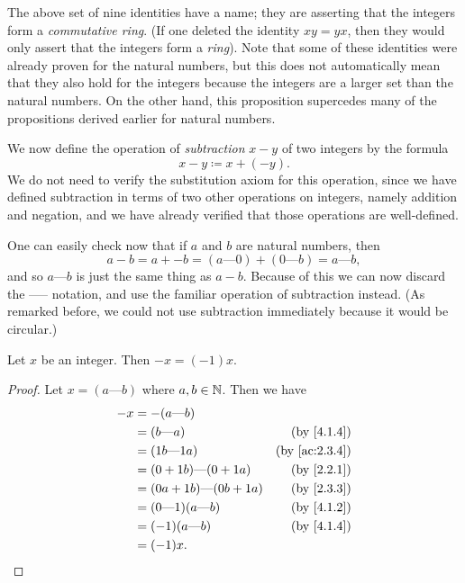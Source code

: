 \begin{rmk}\label{4.1.7}
  The above set of nine identities have a name; they are asserting that the integers form a \emph{commutative ring}.
  (If one deleted the identity \(xy = yx\), then they would only assert that the integers form a \emph{ring}).
  Note that some of these identities were already proven for the natural numbers, but this does not automatically mean that they also hold for the integers because the integers are a larger set than the natural numbers.
  On the other hand, this proposition supercedes many of the propositions derived earlier for natural numbers.
\end{rmk}

\begin{note}
  We now define the operation of \emph{subtraction} \(x - y\) of two integers by the formula
  \[
    x - y \coloneqq x + (-y).
  \]
  We do not need to verify the substitution axiom for this operation, since we have defined subtraction in terms of two other operations on integers, namely addition and negation, and we have already verified that those operations are well-defined.
\end{note}

\begin{note}
  One can easily check now that if \(a\) and \(b\) are natural numbers, then
  \[
    a - b = a + -b = (a \text{---} 0) + (0 \text{---} b) = a \text{---} b,
  \]
  and so \(a \text{---} b\) is just the same thing as \(a - b\).
  Because of this we can now discard the ----- notation, and use the familiar operation of subtraction instead.
  (As remarked before, we could not use subtraction immediately because it would be circular.)
\end{note}

\begin{ac}\label{ac:4.1.3}
  Let \(x\) be an integer.
  Then \(-x = (-1)x\).
\end{ac}

\begin{proof}
  Let \(x = (a \text{---} b)\) where \(a, b \in \mathbb{N}\).
  Then we have
  \begin{align*}
    -x & = -(a \text{---} b)                                              \\
       & = (b \text{---} a)                 & \text{(by \cref{4.1.4})}    \\
       & = (1b \text{---} 1a)               & \text{(by \cref{ac:2.3.4})} \\
       & = (0 + 1b) \text{---} (0 + 1a)     & \text{(by \cref{2.2.1})}    \\
       & = (0a + 1b) \text{---} (0b + 1a)   & \text{(by \cref{2.3.3})}    \\
       & = (0 \text{---} 1)(a \text{---} b) & \text{(by \cref{4.1.2})}    \\
       & = (-1)(a \text{---} b)             & \text{(by \cref{4.1.4})}    \\
       & = (-1)x.
  \end{align*}
\end{proof}

